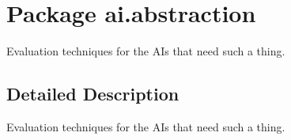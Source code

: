 \hypertarget{namespaceai_1_1abstraction}{
\section{Package ai.abstraction}
\label{namespaceai_1_1abstraction}
}


Evaluation techniques for the AIs that need such a thing.  




\subsection{Detailed Description}
Evaluation techniques for the AIs that need such a thing. 